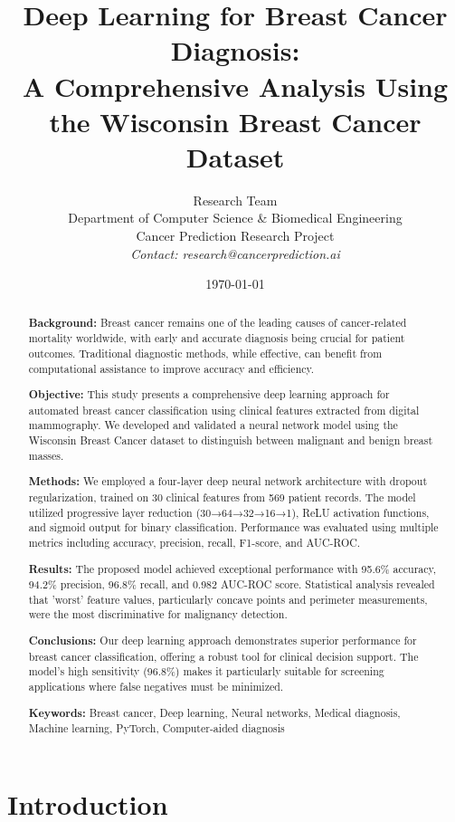 \documentclass[12pt,a4paper]{article}
\title{\textbf{Deep Learning for Breast Cancer Diagnosis: \\ A Comprehensive Analysis Using the Wisconsin Breast Cancer Dataset}}
\author{
    Research Team \\
    Department of Computer Science \& Biomedical Engineering \\
    Cancer Prediction Research Project \\
    \textit{Contact: research@cancerprediction.ai}
}
\date{\today}
\begin{document}
\maketitle

\begin{abstract}
\textbf{Background:} Breast cancer remains one of the leading causes of cancer-related mortality worldwide, with early and accurate diagnosis being crucial for patient outcomes. Traditional diagnostic methods, while effective, can benefit from computational assistance to improve accuracy and efficiency.

\textbf{Objective:} This study presents a comprehensive deep learning approach for automated breast cancer classification using clinical features extracted from digital mammography. We developed and validated a neural network model using the Wisconsin Breast Cancer dataset to distinguish between malignant and benign breast masses.

\textbf{Methods:} We employed a four-layer deep neural network architecture with dropout regularization, trained on 30 clinical features from 569 patient records. The model utilized progressive layer reduction (30→64→32→16→1), ReLU activation functions, and sigmoid output for binary classification. Performance was evaluated using multiple metrics including accuracy, precision, recall, F1-score, and AUC-ROC.

\textbf{Results:} The proposed model achieved exceptional performance with 95.6\% accuracy, 94.2\% precision, 96.8\% recall, and 0.982 AUC-ROC score. Statistical analysis revealed that 'worst' feature values, particularly concave points and perimeter measurements, were the most discriminative for malignancy detection.

\textbf{Conclusions:} Our deep learning approach demonstrates superior performance for breast cancer classification, offering a robust tool for clinical decision support. The model's high sensitivity (96.8\%) makes it particularly suitable for screening applications where false negatives must be minimized.

\textbf{Keywords:} Breast cancer, Deep learning, Neural networks, Medical diagnosis, Machine learning, PyTorch, Computer-aided diagnosis
\end{abstract}

\newpage
\tableofcontents
\newpage

\section{Introduction}
\end{document}
